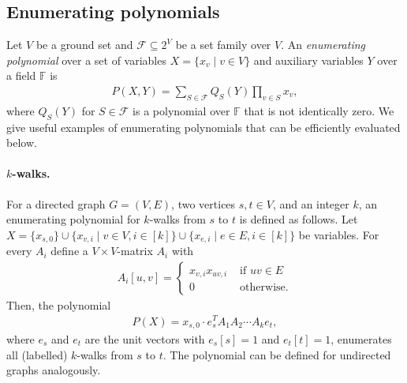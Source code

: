 \documentclass[10pt,a4paper]{article}
\newcommand{\F}{\ensuremath{\mathbb F}\xspace}
\newcommand{\cF}{\ensuremath{\mathcal F}\xspace}
\begin{document}
\subsection{Enumerating polynomials} \label{sec:enum-poly}

Let $V$ be a ground set and $\cF \subseteq 2^V$ be a set family over $V$.
An \emph{enumerating polynomial} over a set of variables $X = \{ x_v \mid v \in V \}$ and auxiliary variables $Y$ over a field $\F$ is
\begin{align*}
  P(X, Y) = \sum_{S \in \cF} Q_S(Y) \prod_{v \in S} x_v,
\end{align*}
where $Q_S(Y)$ for $S \in \cF$ is a polynomial over $\F$ that is not identically zero.
We give useful examples of enumerating polynomials that can be efficiently evaluated below.

\paragraph*{$k$-walks.}
For a directed graph $G = (V, E)$, two vertices $s, t \in V$, and an integer $k$, an enumerating polynomial for $k$-walks from $s$ to $t$ is defined as follows.
Let $X = \{ x_{s,0} \} \cup \{ x_{v,i} \mid v \in V, i \in [k] \} \cup \{ x_{e,i} \mid e \in E, i \in [k] \}$ be variables.
For every $A_i$ define a $V \times V$-matrix $A_i$ with
\begin{align*}
  A_i[u,v] = \begin{cases}
    x_{v,i} x_{uv,i} & \text{ if } uv \in E \\
    0 & \text{ otherwise.}
  \end{cases}
\end{align*}
Then, the polynomial
\begin{align*}
  P(X) = x_{s,0} \cdot e_s^T A_1 A_2 \cdots A_{k} e_t,
\end{align*}
where $e_s$ and $e_t$ are the unit vectors with $e_s[s] = 1$ and $e_t[t] = 1$, enumerates all (labelled) $k$-walks from $s$ to $t$.
The polynomial can be defined for undirected graphs analogously.
\end{document}
